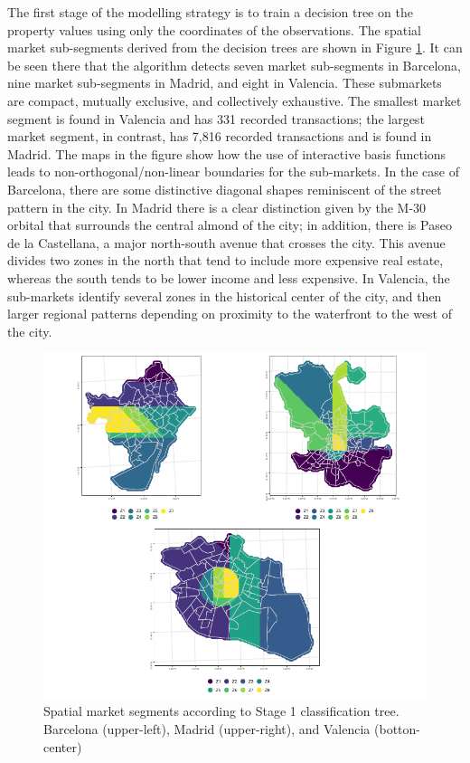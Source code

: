 \documentclass[Royal,times,sageh]{sagej}
\begin{document}
The first stage of the modelling strategy is to train a decision tree on
the property values using only the coordinates of the observations. The
spatial market sub-segments derived from the decision trees are shown in
Figure \ref{fig:all-market-segments}. It can be seen there that the
algorithm detects seven market sub-segments in Barcelona, nine market
sub-segments in Madrid, and eight in Valencia. These submarkets are
compact, mutually exclusive, and collectively exhaustive. The smallest
market segment is found in Valencia and has 331 recorded transactions;
the largest market segment, in contrast, has 7,816 recorded transactions
and is found in Madrid. The maps in the figure show how the use of
interactive basis functions leads to non-orthogonal/non-linear
boundaries for the sub-markets. In the case of Barcelona, there are some
distinctive diagonal shapes reminiscent of the street pattern in the
city. In Madrid there is a clear distinction given by the M-30 orbital
that surrounds the central almond of the city; in addition, there is
Paseo de la Castellana, a major north-south avenue that crosses the
city. This avenue divides two zones in the north that tend to include
more expensive real estate, whereas the south tends to be lower income
and less expensive. In Valencia, the sub-markets identify several zones
in the historical center of the city, and then larger regional patterns
depending on proximity to the waterfront to the west of the city.

\begin{figure}
\centering
\includegraphics{EPB-preprint_files/figure-latex/unnamed-chunk-1-1.pdf}
\caption{\label{fig:all-market-segments}Spatial market segments
according to Stage 1 classification tree. Barcelona (upper-left), Madrid
(upper-right), and Valencia (botton-center)}
\end{figure}
\end{document}

